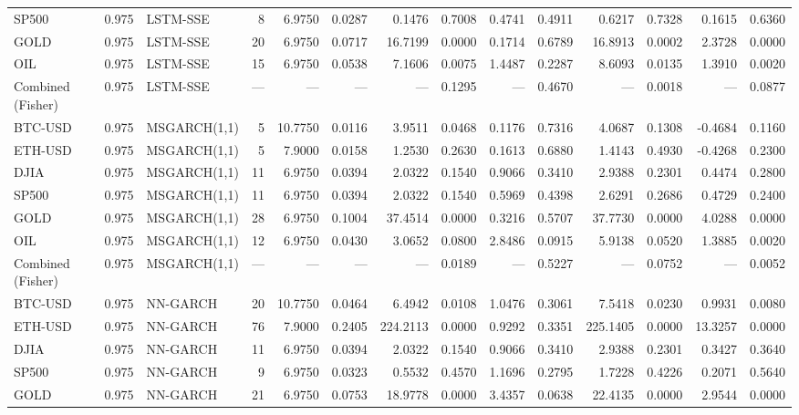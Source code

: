 \begin{table}[ht]
\begin{tabular}{lllrrrrrrrrrrr}
SP500 & 0.975 & LSTM-SSE & 8 & 6.9750 & 0.0287 & 0.1476 & 0.7008 & 0.4741 & 0.4911 & 0.6217 & 0.7328 & 0.1615 & 0.6360 \\
GOLD & 0.975 & LSTM-SSE & 20 & 6.9750 & 0.0717 & 16.7199 & 0.0000 & 0.1714 & 0.6789 & 16.8913 & 0.0002 & 2.3728 & 0.0000 \\
OIL & 0.975 & LSTM-SSE & 15 & 6.9750 & 0.0538 & 7.1606 & 0.0075 & 1.4487 & 0.2287 & 8.6093 & 0.0135 & 1.3910 & 0.0020 \\
Combined (Fisher) & 0.975 & LSTM-SSE & — & — & — & — & 0.1295 & — & 0.4670 & — & 0.0018 & — & 0.0877 \\
BTC-USD & 0.975 & MSGARCH(1,1) & 5 & 10.7750 & 0.0116 & 3.9511 & 0.0468 & 0.1176 & 0.7316 & 4.0687 & 0.1308 & -0.4684 & 0.1160 \\
ETH-USD & 0.975 & MSGARCH(1,1) & 5 & 7.9000 & 0.0158 & 1.2530 & 0.2630 & 0.1613 & 0.6880 & 1.4143 & 0.4930 & -0.4268 & 0.2300 \\
DJIA & 0.975 & MSGARCH(1,1) & 11 & 6.9750 & 0.0394 & 2.0322 & 0.1540 & 0.9066 & 0.3410 & 2.9388 & 0.2301 & 0.4474 & 0.2800 \\
SP500 & 0.975 & MSGARCH(1,1) & 11 & 6.9750 & 0.0394 & 2.0322 & 0.1540 & 0.5969 & 0.4398 & 2.6291 & 0.2686 & 0.4729 & 0.2400 \\
GOLD & 0.975 & MSGARCH(1,1) & 28 & 6.9750 & 0.1004 & 37.4514 & 0.0000 & 0.3216 & 0.5707 & 37.7730 & 0.0000 & 4.0288 & 0.0000 \\
OIL & 0.975 & MSGARCH(1,1) & 12 & 6.9750 & 0.0430 & 3.0652 & 0.0800 & 2.8486 & 0.0915 & 5.9138 & 0.0520 & 1.3885 & 0.0020 \\
Combined (Fisher) & 0.975 & MSGARCH(1,1) & — & — & — & — & 0.0189 & — & 0.5227 & — & 0.0752 & — & 0.0052 \\
BTC-USD & 0.975 & NN-GARCH & 20 & 10.7750 & 0.0464 & 6.4942 & 0.0108 & 1.0476 & 0.3061 & 7.5418 & 0.0230 & 0.9931 & 0.0080 \\
ETH-USD & 0.975 & NN-GARCH & 76 & 7.9000 & 0.2405 & 224.2113 & 0.0000 & 0.9292 & 0.3351 & 225.1405 & 0.0000 & 13.3257 & 0.0000 \\
DJIA & 0.975 & NN-GARCH & 11 & 6.9750 & 0.0394 & 2.0322 & 0.1540 & 0.9066 & 0.3410 & 2.9388 & 0.2301 & 0.3427 & 0.3640 \\
SP500 & 0.975 & NN-GARCH & 9 & 6.9750 & 0.0323 & 0.5532 & 0.4570 & 1.1696 & 0.2795 & 1.7228 & 0.4226 & 0.2071 & 0.5640 \\
GOLD & 0.975 & NN-GARCH & 21 & 6.9750 & 0.0753 & 18.9778 & 0.0000 & 3.4357 & 0.0638 & 22.4135 & 0.0000 & 2.9544 & 0.0000 \\

\end{tabular}
\end{table}
